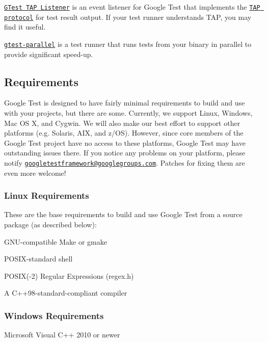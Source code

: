 \href{https://github.com/kinow/gtest-tap-listener}{\tt G\-Test T\-A\-P Listener} is an event listener for Google Test that implements the \href{https://en.wikipedia.org/wiki/Test_Anything_Protocol}{\tt T\-A\-P protocol} for test result output. If your test runner understands T\-A\-P, you may find it useful.

\href{https://github.com/google/gtest-parallel}{\tt gtest-\/parallel} is a test runner that runs tests from your binary in parallel to provide significant speed-\/up.

\subsection*{Requirements}

Google Test is designed to have fairly minimal requirements to build and use with your projects, but there are some. Currently, we support Linux, Windows, Mac O\-S X, and Cygwin. We will also make our best effort to support other platforms (e.\-g. Solaris, A\-I\-X, and z/\-O\-S). However, since core members of the Google Test project have no access to these platforms, Google Test may have outstanding issues there. If you notice any problems on your platform, please notify \href{https://groups.google.com/forum/#!forum/googletestframework}{\tt googletestframework@googlegroups.\-com}. Patches for fixing them are even more welcome!

\subsubsection*{Linux Requirements}

These are the base requirements to build and use Google Test from a source package (as described below)\-:


\begin{DoxyItemize}
\item G\-N\-U-\/compatible Make or gmake
\item P\-O\-S\-I\-X-\/standard shell
\item P\-O\-S\-I\-X(-\/2) Regular Expressions (regex.\-h)
\item A C++98-\/standard-\/compliant compiler
\end{DoxyItemize}

\subsubsection*{Windows Requirements}


\begin{DoxyItemize}
\item Microsoft Visual C++ 2010 or newer
\end{DoxyItemize}

